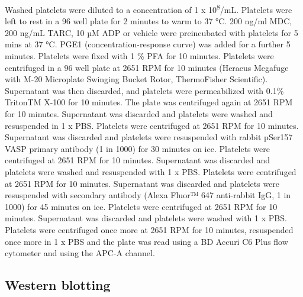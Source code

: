 \documentclass[11pt,twoside]{bristolthesis}
\begin{document}
Washed platelets were diluted to a concentration of 1 x 10\textsuperscript{8}/mL. Platelets were left to rest in a 96 well plate for 2 minutes to warm to 37 °C. 200 ng/ml MDC, 200 ng/mL TARC, 10 µM ADP or vehicle were preincubated with platelets for 5 mins at 37 °C. PGE1 (concentration-response curve) was added for a further 5 minutes. Platelets were fixed with 1 \% PFA for 10 minutes. Platelets were centrifuged in a 96 well plate at 2651 RPM for 10 minutes (Heraeus Megafuge with M-20 Microplate Swinging Bucket Rotor, ThermoFisher Scientific). Supernatant was then discarded, and platelets were permeabilized with 0.1\% TritonTM X-100 for 10 minutes. The plate was centrifuged again at 2651 RPM for 10 minutes. Supernatant was discarded and platelets were washed and resuspended in 1 x PBS. Platelets were centrifuged at 2651 RPM for 10 minutes. Supernatant was discarded and platelets were resuspended with rabbit pSer157 VASP primary antibody (1 in 1000) for 30 minutes on ice. Platelets were centrifuged at 2651 RPM for 10 minutes. Supernatant was discarded and platelets were washed and resuspended with 1 x PBS. Platelets were centrifuged at 2651 RPM for 10 minutes. Supernatant was discarded and platelets were resuspended with secondary antibody (Alexa Fluor™ 647 anti-rabbit IgG, 1 in 1000) for 45 minutes on ice. Platelets were centrifuged at 2651 RPM for 10 minutes. Supernatant was discarded and platelets were washed with 1 x PBS. Platelets were centrifuged once more at 2651 RPM for 10 minutes, resuspended once more in 1 x PBS and the plate was read using a BD Accuri C6 Plus flow cytometer and using the APC-A channel.

\hypertarget{western-blotting}{%
\subsection{Western blotting}\label{western-blotting}}
\end{document}
